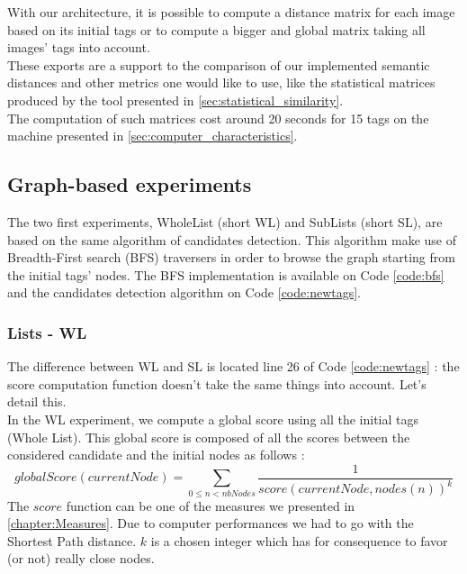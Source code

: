 With our architecture, it is possible to compute a distance matrix for each image based on its initial tags or to compute a bigger and global matrix taking all images' tags into account.\\

These exports are a support to the comparison of our implemented semantic distances and other metrics one would like to use, like the statistical matrices produced by the tool presented in \ref{sec:statistical_similarity}.\\

The computation of such matrices cost around 20 seconds for 15 tags on the machine presented in \ref{sec:computer_characteristics}.

\subsection{Graph-based experiments} %
\label{sub:graph_based_experiments}
The two first experiments, WholeList (short WL) and SubLists (short SL), are based on the same algorithm of candidates detection. This algorithm make use of Breadth-First search (BFS) traversers in order to browse the graph starting from the initial tags' nodes. The BFS implementation is available on Code \ref{code:bfs} and the candidates detection algorithm on Code \ref{code:newtags}.\\


\subsubsection{Lists - WL} %
\label{ssub:lists_wl}
The difference between WL and SL is located line 26 of Code \ref{code:newtags} : the score computation function doesn't take the same things into account. Let's detail this.\\
In the WL experiment, we compute a global score using all the initial tags (Whole List). This global score is composed of all the scores between the considered candidate and the initial nodes as follows :
\begin{equation}
\label{eq:wholeList}
globalScore(currentNode) = \sum_{0\le n< nbNodes} \frac{1}{score(currentNode, nodes(n))^k}
\end{equation}
The $score$ function can be one of the measures we presented in \ref{chapter:Measures}. Due to computer performances we had to go with the Shortest Path distance. $k$ is a chosen integer which has for consequence to favor (or not) really close nodes.
